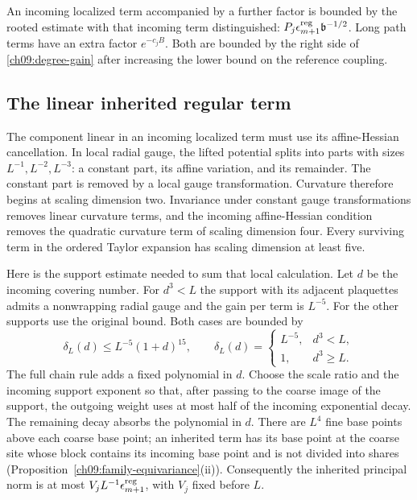 An incoming localized term accompanied by a further factor
is bounded by the rooted estimate with that incoming term
distinguished:
$P_j\epsilon_{m+1}^{\rm reg}\mathfrak b^{-1/2}$.
Long path terms have an extra factor $e^{-c_jB}$.
Both are bounded by the right side of \eqref{ch09:degree-gain} after
increasing the lower bound on the reference coupling.

\subsection{The linear inherited regular term}

The component linear in an incoming localized term must use
its affine-Hessian cancellation. In local radial gauge, the
lifted potential splits into parts with sizes
$L^{-1},L^{-2},L^{-3}$: a constant part, its affine variation,
and its remainder. The constant part is removed by a local
gauge transformation. Curvature therefore begins at scaling dimension
two. Invariance under constant gauge transformations removes linear curvature terms,
and the incoming affine-Hessian condition removes the
quadratic curvature term of scaling dimension four. Every surviving
term in the ordered Taylor expansion has scaling dimension at least
five.

Here is the support estimate needed to sum that local
calculation. Let $d$ be the incoming covering number.
For $d^3<L$ the support with its adjacent plaquettes admits a nonwrapping
radial gauge and the gain per term is $L^{-5}$.
For the other supports use the original bound. Both cases
are bounded by
\[
 \delta_L(d)\le L^{-5}(1+d)^{15},\qquad
 \delta_L(d)=
 \begin{cases}L^{-5},&d^3<L,\\1,&d^3\ge L.\end{cases}
\]
The full chain rule adds a fixed polynomial in $d$.
Choose the scale ratio and the incoming support exponent so that, after
passing to the coarse image of the support, the outgoing weight uses at most half of the
incoming exponential decay. The remaining decay absorbs the polynomial
in $d$.
There are $L^4$ fine base points above each coarse base point; an inherited term has its base point at the coarse site whose block contains its incoming base point and is not divided into shares (Proposition~\ref{ch09:family-equivariance}(ii)).
Consequently the inherited principal norm is at most
$V_jL^{-1}\epsilon_{m+1}^{\rm reg}$, with $V_j$ fixed before
$L$.

